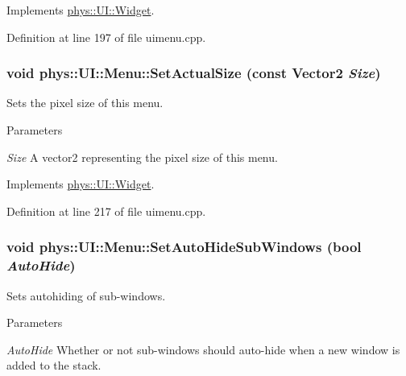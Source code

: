 Implements \hyperlink{classphys_1_1UI_1_1Widget_acba334c000c21f477238e961cd3ab2ce}{phys::UI::Widget}.



Definition at line 197 of file uimenu.cpp.

\hypertarget{classphys_1_1UI_1_1Menu_a9bbb3c347fa49cb0f3cbe50293966cf3}{
\subsubsection[{SetActualSize}]{\setlength{\rightskip}{0pt plus 5cm}void phys::UI::Menu::SetActualSize (const {\bf Vector2} {\em Size})}}
\label{d6/dd3/classphys_1_1UI_1_1Menu_a9bbb3c347fa49cb0f3cbe50293966cf3}


Sets the pixel size of this menu. 


\begin{DoxyParams}{Parameters}
\item[{\em Size}]A vector2 representing the pixel size of this menu. \end{DoxyParams}


Implements \hyperlink{classphys_1_1UI_1_1Widget_a8c942355474d0b250dfadd4dac4ae400}{phys::UI::Widget}.



Definition at line 217 of file uimenu.cpp.

\hypertarget{classphys_1_1UI_1_1Menu_a5525e3823dcd23269cd410dfb2a1e232}{
\subsubsection[{SetAutoHideSubWindows}]{\setlength{\rightskip}{0pt plus 5cm}void phys::UI::Menu::SetAutoHideSubWindows (bool {\em AutoHide})}}
\label{d6/dd3/classphys_1_1UI_1_1Menu_a5525e3823dcd23269cd410dfb2a1e232}


Sets autohiding of sub-\/windows. 


\begin{DoxyParams}{Parameters}
\item[{\em AutoHide}]Whether or not sub-\/windows should auto-\/hide when a new window is added to the stack. \end{DoxyParams}


